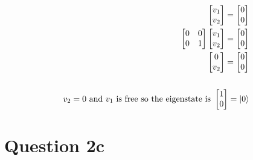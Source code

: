 \documentclass{article}
\begin{document}
\begin{align*}
\begin{split}
        \begin{bmatrix}
            v_1 \\
            v_2
        \end{bmatrix} =
        \begin{bmatrix}
            0 \\
            0
        \end{bmatrix} \\
        \begin{bmatrix}
            0 & 0 \\
            0 & 1
        \end{bmatrix}
        \begin{bmatrix} 
            v_1 \\
            v_2
        \end{bmatrix} =
        \begin{bmatrix}
            0 \\
            0
        \end{bmatrix} \\
        \begin{bmatrix}
            0 \\
            v_2
        \end{bmatrix}
        = \begin{bmatrix}
            0 \\
            0
        \end{bmatrix} \\\\
        v_2 = 0 \text{ and } v_1 \text{ is free so the eigenstate is } \begin{bmatrix} 1 \\ 0 \end{bmatrix} = \ket{0} \\
    \end{split}
\end{align*}

\section*{Question 2c}
\end{document}
